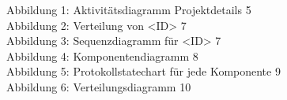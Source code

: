 






\tableofcontents                          %
\listoffigures                            %

Abbildung 1: Aktivitätsdiagramm Projektdetails  5 \\
Abbildung 2: Verteilung von <ID>  7       \\
Abbildung 3: Sequenzdiagramm für <ID>  7  \\
Abbildung 4: Komponentendiagramm  8       \\
Abbildung 5: Protokollstatechart für jede Komponente  9    \\
Abbildung 6: Verteilungsdiagramm  10      \\






